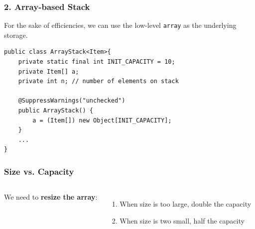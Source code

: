 \documentclass[aspectratio=169, 14pt]{beamer}
\begin{document}
\begin{frame}[fragile]
    \frametitle{2. Array-based Stack}
For the sake of efficiencies, we can use the low-level \texttt{array} as the underlying storage.

\begin{verbatim}
public class ArrayStack<Item>{
    private static final int INIT_CAPACITY = 10;
    private Item[] a;
    private int n; // number of elements on stack

    @SuppressWarnings("unchecked")
    public ArrayStack() {
        a = (Item[]) new Object[INIT_CAPACITY];
    }
    ...
}
\end{verbatim}

\end{frame}

\begin{frame}[fragile]
    \frametitle{Size vs. Capacity}

    \begin{columns}

        We need to \textbf{resize the array}:

        \begin{enumerate}
            \item When size is too large, double the capacity
            \item When size is two small, half the capacity
        \end{enumerate}        
    \end{columns}

\end{frame}
\end{document}
